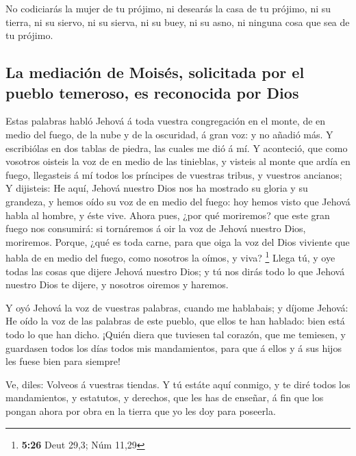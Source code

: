  No codiciarás la mujer de tu prójimo, ni desearás la casa
de tu prójimo, ni su tierra, ni su siervo, ni su sierva, ni su buey, ni
su asno, ni ninguna cosa que sea de tu prójimo.

\hypertarget{la-mediaciuxf3n-de-moisuxe9s-solicitada-por-el-pueblo-temeroso-es-reconocida-por-dios}{%
\subsection{La mediación de Moisés, solicitada por el pueblo temeroso,
es reconocida por
Dios}\label{la-mediaciuxf3n-de-moisuxe9s-solicitada-por-el-pueblo-temeroso-es-reconocida-por-dios}}

 Estas palabras habló Jehová á toda vuestra congregación en
el monte, de en medio del fuego, de la nube y de la oscuridad, á gran
voz: y no añadió más. Y escribiólas en dos tablas de piedra, las cuales
me dió á mí.  Y aconteció, que como vosotros oisteis la voz
de en medio de las tinieblas, y visteis al monte que ardía en fuego,
llegasteis á mí todos los príncipes de vuestras tribus, y vuestros
ancianos;  Y dijisteis: He aquí, Jehová nuestro Dios nos ha
mostrado su gloria y su grandeza, y hemos oído su voz de en medio del
fuego: hoy hemos visto que Jehová habla al hombre, y éste vive.
 Ahora pues, ¿por qué moriremos? que este gran fuego nos
consumirá: si tornáremos á oir la voz de Jehová nuestro Dios, moriremos.
 Porque, ¿qué es toda carne, para que oiga la voz del Dios
viviente que habla de en medio del fuego, como nosotros la oímos, y
viva? \footnote{\textbf{5:26} Deut 29,3; Núm 11,29}  Llega
tú, y oye todas las cosas que dijere Jehová nuestro Dios; y tú nos dirás
todo lo que Jehová nuestro Dios te dijere, y nosotros oiremos y haremos.

 Y oyó Jehová la voz de vuestras palabras, cuando me
hablabais; y díjome Jehová: He oído la voz de las palabras de este
pueblo, que ellos te han hablado: bien está todo lo que han dicho.
 ¡Quién diera que tuviesen tal corazón, que me temiesen, y
guardasen todos los días todos mis mandamientos, para que á ellos y á
sus hijos les fuese bien para siempre!

 Ve, diles: Volveos á vuestras tiendas.  Y tú
estáte aquí conmigo, y te diré todos los mandamientos, y estatutos, y
derechos, que les has de enseñar, á fin que los pongan ahora por obra en
la tierra que yo les doy para poseerla.

